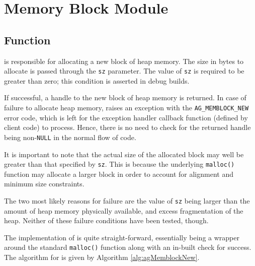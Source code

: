 \chapter{Memory Block Module}
\newpage


%
%
\section{Function \agMemblockNew}

\agMemblockNew  is responsible for allocating a new block of heap memory. The 
size in bytes to allocate is passed through the \verb|sz| parameter. The value 
of \verb|sz| is required to be greater than zero; this condition is asserted in 
debug builds.

If successful, a handle to the new block of heap memory is returned. In case of 
failure to allocate heap memory, \agMemblockNew raises an exception with the 
\verb|AG_MEMBLOCK_NEW| error code, which is left for the exception handler 
callback function (defined by client code) to process. Hence, there is no need 
to check for the returned handle being non-\verb|NULL| in the normal 
flow of code.

It is important to note that the actual size of the allocated block may well be
greater than that specified by \verb|sz|. This is because the underlying
\verb|malloc()| function may allocate a larger block in order to account for
alignment and minimum size constraints.


The two most likely reasons for failure are the value of \verb|sz| being
larger than the amount of heap memory physically available, and excess
fragmentation of the heap. Neither of these failure conditions have been tested,
though.

The implementation of \agMemblockNew is quite straight-forward, essentially
being a wrapper around the standard \verb|malloc()| function along with an
in-built check for success. The algorithm for \agMemblockNew is given by 
Algorithm \ref{alg:agMemblockNew}.

